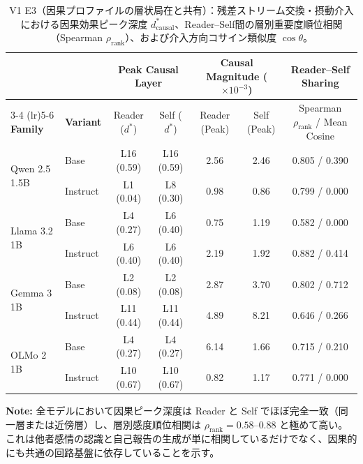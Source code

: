 \begin{table}[htbp]
\centering
\small
\caption{V1 E3（因果プロファイルの層状局在と共有）：残差ストリーム交換・摂動介入における因果効果ピーク深度 $d_{\text{causal}}^*$、Reader--Self間の層別重要度順位相関（Spearman $\rho_{\text{rank}}$）、および介入方向コサイン類似度 $\cos\theta$。}
\label{tab:v1_causal_profile}
\begin{tabular}{ll cccc c}
\toprule
 & & \multicolumn{2}{c}{\textbf{Peak Causal Layer}} & \multicolumn{2}{c}{\textbf{Causal Magnitude ($\times 10^{-3}$)}} & \textbf{Reader--Self Sharing} \\
\cmidrule(lr){3-4} \cmidrule(lr){5-6}
\textbf{Family} & \textbf{Variant} & Reader ($d^*$) & Self ($d^*$) & Reader (Peak) & Self (Peak) & Spearman $\rho_{\text{rank}}$ / Mean Cosine \\
\midrule
\multirow{2}{*}{Qwen 2.5 1.5B} & Base       & L16 (0.59) & L16 (0.59) & 2.56 & 2.46 & 0.805 / 0.390 \\
                       & Instruct   & L1 (0.04) & L8 (0.30) & 0.98 & 0.86 & 0.799 / 0.000 \\
\midrule
\multirow{2}{*}{Llama 3.2 1B} & Base       & L4 (0.27) & L6 (0.40) & 0.75 & 1.19 & 0.582 / 0.000 \\
                       & Instruct   & L6 (0.40) & L6 (0.40) & 2.19 & 1.92 & 0.882 / 0.414 \\
\midrule
\multirow{2}{*}{Gemma 3 1B} & Base       & L2 (0.08) & L2 (0.08) & 2.87 & 3.70 & 0.802 / 0.712 \\
                       & Instruct   & L11 (0.44) & L11 (0.44) & 4.89 & 8.21 & 0.646 / 0.266 \\
\midrule
\multirow{2}{*}{OLMo 2 1B} & Base       & L4 (0.27) & L4 (0.27) & 6.14 & 1.66 & 0.715 / 0.210 \\
                       & Instruct   & L10 (0.67) & L10 (0.67) & 0.82 & 1.17 & 0.771 / 0.000 \\
\bottomrule
\end{tabular}
\vspace{1ex}
\begin{minipage}{\linewidth}
\footnotesize
\textbf{Note:} 全モデルにおいて因果ピーク深度は Reader と Self でほぼ完全一致（同一層または近傍層）し、層別感度順位相関は $\rho_{\text{rank}} = 0.58$--$0.88$ と極めて高い。これは他者感情の認識と自己報告の生成が単に相関しているだけでなく、因果的にも共通の回路基盤に依存していることを示す。
\end{minipage}
\end{table}